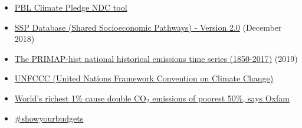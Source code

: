 \documentclass[12pt]{article}
\begin{document}
\begin{itemize}
 \vspace{-.2cm} \item \href{https://themasites.pbl.nl/o/climate-ndc-policies-tool/}{PBL Climate Pledge NDC tool} 
 \vspace{-.2cm} \item \href{https://tntcat.iiasa.ac.at/SspDb/dsd?Action=htmlpage&page=about}{SSP Database (Shared Socioeconomic Pathways) - Version 2.0} (December 2018)
 \vspace{-.2cm} \item \href{https://dataservices.gfz-potsdam.de/pik/showshort.php?id=escidoc:4736895}{The PRIMAP-hist national historical emissions time series (1850-2017)} (2019)
 \vspace{-.2cm} \item \href{https://unfccc.int/}{UNFCCC (United Nations Framework Convention on Climate Change)} 
 \vspace{-.2cm} \item \href{https://www.theguardian.com/environment/2020/sep/21/worlds-richest-1-cause-double-co2-emissions-of-poorest-50-says-oxfam?utm_campaign=Carbon%20Brief%20Daily%20Briefing&utm_medium=email&utm_source=Revue%20newsletter}{World's richest 1\% cause double CO$_2$ emissions of poorest 50\%, says Oxfam} 
 \vspace{-.2cm} \item \href{https://www.showyourbudgets.org/de/?country=whole_world}{\#showyourbudgets} 
 \end{itemize}

 
\end{document}
